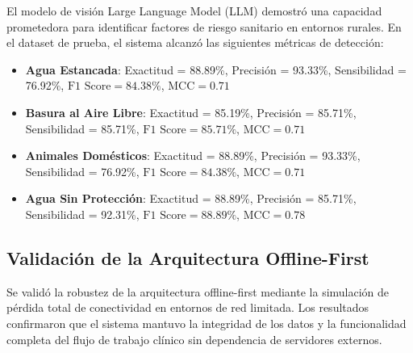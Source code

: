 El modelo de visión Large Language Model (LLM) demostró una capacidad prometedora para identificar factores de riesgo sanitario en entornos rurales. En el dataset de prueba, el sistema alcanzó las siguientes métricas de detección:
\begin{itemize}
    \item \textbf{Agua Estancada}: Exactitud = 88.89\%, Precisión = 93.33\%, Sensibilidad = 76.92\%, $\text{F1 Score} = 84.38\%$, $\text{MCC} = 0.71$
    \item \textbf{Basura al Aire Libre}: Exactitud = 85.19\%, Precisión = 85.71\%, Sensibilidad = 85.71\%, $\text{F1 Score} = 85.71\%$, $\text{MCC} = 0.71$
    \item \textbf{Animales Domésticos}: Exactitud = 88.89\%, Precisión = 93.33\%, Sensibilidad = 76.92\%, $\text{F1 Score} = 84.38\%$, $\text{MCC} = 0.71$
    \item \textbf{Agua Sin Protección}: Exactitud = 88.89\%, Precisión = 85.71\%, Sensibilidad = 92.31\%, $\text{F1 Score} = 88.89\%$, $\text{MCC} = 0.78$
\end{itemize}


\subsection{Validación de la Arquitectura Offline-First}
\label{sec:resultados_offline}

Se validó la robustez de la arquitectura offline-first mediante la simulación de pérdida total de conectividad en entornos de red limitada. Los resultados confirmaron que el sistema mantuvo la integridad de los datos y la funcionalidad completa del flujo de trabajo clínico sin dependencia de servidores externos.

